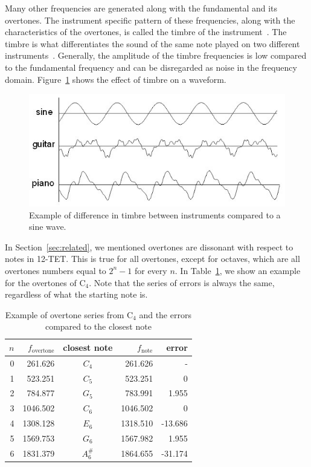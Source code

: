 \documentclass[10pt,twocolumn]{article}
\newcommand{\note}[2]{#1${}_{#2}$}
\begin{document}
Many other frequencies are generated along with the fundamental and its overtones. The instrument specific pattern of these frequencies, along with the characteristics of the overtones, is called the timbre of the instrument~\cite{timbre}. The timbre is what differentiates the sound of the same note played on two different instruments~\cite{perception}. Generally, the amplitude of the timbre frequencies is low compared to the fundamental frequency and can be disregarded as noise in the frequency domain. Figure~\ref{fig:timbre} shows the effect of timbre on a waveform.
\begin{figure}[H]
    \centering
    \includegraphics[width=\linewidth]{fig/timbre.jpg}
    \caption{Example of difference in timbre between instruments compared to a sine wave.}
    \label{fig:timbre}
\end{figure}

In Section~\ref{sec:related}, we mentioned overtones are dissonant with respect to notes in 12-TET. This is true for all overtones, except for octaves, which are all overtones numbers equal to $2^n - 1$ for every $n$. In Table~\ref{tab:overseries}, we show an example for the overtones of \note{C}{4}. Note that the series of errors is always the same, regardless of what the starting note is. 
\begin{table}[H]
    \centering
    \begin{tabular}{rrcrr}
        $n$ & $f_{\text{overtone}}$ & closest note & $f_\text{note}$ & error \\
        \hline
        0 & 261.626  & $C_4$    & 261.626  &  - \\
        1 & 523.251  & $C_5$    & 523.251  &  0 \\
        2 & 784.877  & $G_5$    & 783.991  &  1.955 \\
        3 & 1046.502 & $C_6$    & 1046.502 &  0 \\
        4 & 1308.128 & $E_6$    & 1318.510 &  -13.686 \\
        5 & 1569.753 & $G_6$    & 1567.982 &  1.955 \\
        6 & 1831.379 & $A^\#_6$ & 1864.655 &  -31.174
    \end{tabular}
    \caption{Example of overtone series from \note{C}{4} and the errors compared to the closest note}
    \label{tab:overseries}
\end{table}
\end{document}
